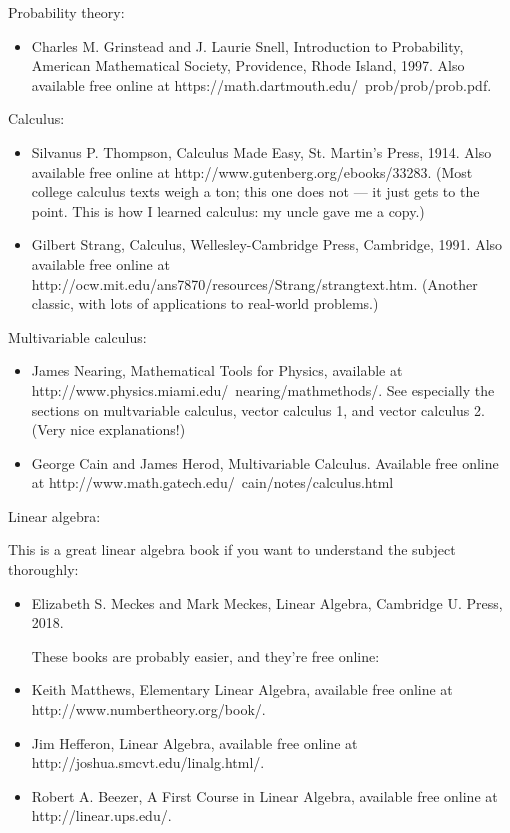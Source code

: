 \documentclass[10pt,a4paper]{book}
\theoremstyle{definition}
\begin{document}
Probability theory:

\begin{itemize}
\item Charles M. Grinstead and J. Laurie Snell, Introduction to Probability, American Mathematical Society, Providence, Rhode Island, 1997. Also available free online at https://math.dartmouth.edu/~prob/prob/prob.pdf.
\end{itemize}

Calculus:

\begin{itemize}
\item Silvanus P. Thompson, Calculus Made Easy, St. Martin's Press, 1914. Also available free online at http://www.gutenberg.org/ebooks/33283. (Most college calculus texts weigh a ton; this one does not — it just gets to the point. This is how I learned calculus: my uncle gave me a copy.)

\item Gilbert Strang, Calculus, Wellesley-Cambridge Press, Cambridge, 1991. Also available free online at http://ocw.mit.edu/ans7870/resources/Strang/strangtext.htm. (Another classic, with lots of applications to real-world problems.)
\end{itemize}

Multivariable calculus:

\begin{itemize}
\item James Nearing, Mathematical Tools for Physics, available at http://www.physics.miami.edu/~nearing/mathmethods/. See especially the sections on multvariable calculus, vector calculus 1, and vector calculus 2. (Very nice explanations!)

\item George Cain and James Herod, Multivariable Calculus. Available free online at http://www.math.gatech.edu/~cain/notes/calculus.html
\end{itemize}

Linear algebra:

This is a great linear algebra book if you want to understand the subject thoroughly:

\begin{itemize}
\item Elizabeth S. Meckes and Mark Meckes, Linear Algebra, Cambridge U. Press, 2018.

These books are probably easier, and they're free online:

\item Keith Matthews, Elementary Linear Algebra, available free online at http://www.numbertheory.org/book/.

\item Jim Hefferon, Linear Algebra, available free online at http://joshua.smcvt.edu/linalg.html/.

\item Robert A. Beezer, A First Course in Linear Algebra, available free online at http://linear.ups.edu/.
\end{itemize}
\end{document}
